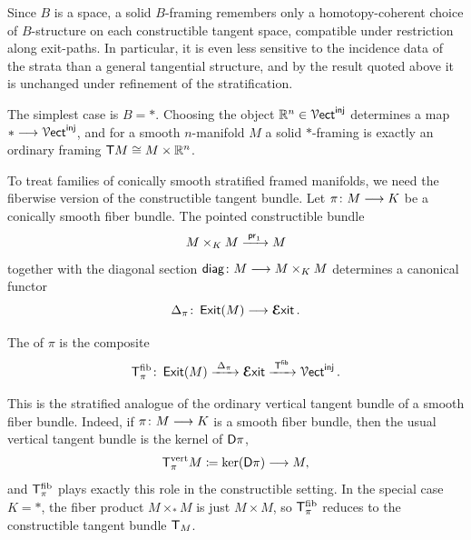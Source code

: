 \begin{remark}
    Since $B$ is a space, a solid $B$-framing remembers only a homotopy-coherent choice of $B$-structure on each constructible tangent space, compatible under restriction along exit-paths. In particular, it is even less sensitive to the incidence data of the strata than a general tangential structure, and by the result quoted above it is unchanged under refinement of the stratification.
\end{remark}

\begin{example}
    The simplest case is $B=*$. Choosing the object $\mathbb R^n\in \operatorname{\mathcal V{\sf ect}}^{\operatorname{\mathsf{inj}}}$ determines a map $* \longrightarrow \operatorname{\mathcal V{\sf ect}}^{\operatorname{\mathsf{inj}}}$, and for a smooth $n$-manifold $M$ a solid $*$-framing is exactly an ordinary framing $\mathsf T M \cong M\times \mathbb R^n$.
\end{example}

To treat families of conically smooth stratified framed manifolds, we need the fiberwise version of the constructible tangent bundle. Let $\pi\colon M \longrightarrow K$ be a conically smooth fiber bundle. The pointed constructible bundle
\begin{equation}
    M\times_{K} M \xrightarrow{\;\mathsf{pr}_1\;} M
\end{equation}
together with the diagonal section $\mathsf{diag}\colon M \longrightarrow M\times_{K} M$ determines a canonical functor
\begin{equation}
    \Delta_{\pi}\colon \operatorname{\sf Exit}(M)\longrightarrow \operatorname{\boldsymbol{\mathcal E}{\sf xit}}.
\end{equation}

\begin{definition}
    The  of $\pi$ is the composite
    \begin{equation}
        \mathsf T^{\mathrm{fib}}_{\pi}\colon \operatorname{\sf Exit}(M) \xrightarrow{\;\Delta_{\pi}\;} \operatorname{\boldsymbol{\mathcal E}{\sf xit}} \xrightarrow{\;\mathsf T^{\sf fib}\;} \operatorname{\mathcal V{\sf ect}}^{\operatorname{\mathsf{inj}}}.
    \end{equation}
\end{definition}

This is the stratified analogue of the ordinary vertical tangent bundle of a smooth fiber bundle. Indeed, if $\pi\colon M \longrightarrow K$ is a smooth fiber bundle, then the usual vertical tangent bundle is the kernel of $\mathsf D\pi$,
\begin{equation}
    \mathsf T^{\mathrm{vert}}_{\pi}M\coloneqq \ker(\mathsf D\pi)\longrightarrow M,
\end{equation}
and $\mathsf T^{\mathrm{fib}}_{\pi}$ plays exactly this role in the constructible setting. In the special case $K=*$, the fiber product $M\times_{*}M$ is just $M\times M$, so $\mathsf T^{\mathrm{fib}}_{\pi}$ reduces to the constructible tangent bundle $\mathsf T_M$.

